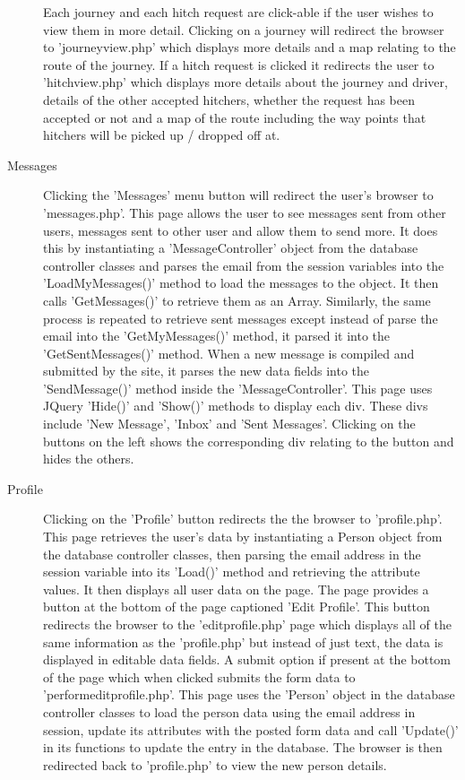 \begin{description}
		Each journey and each hitch request are click-able if the user wishes to view them in more detail. Clicking on a journey will redirect the browser to 'journey\textunderscore view.php' which displays more details and a map relating to the route of the journey. If a hitch request is clicked it redirects the user to 'hitch\textunderscore view.php' which displays more details about the journey and driver, details of the other accepted hitchers, whether the request has been accepted or not and a map of the route including the way points that hitchers will be picked up / dropped off at.
		\item[Messages] Clicking the 'Messages' menu button will redirect the user's browser to 'messages.php'. This page allows the user to see messages sent from other users, messages sent to other user and allow them to send more. It does this by instantiating a 'Message\textunderscore Controller' object from the database controller classes and parses the email from the session variables into the 'LoadMyMessages()' method to load the messages to the object. It then calls 'GetMessages()' to retrieve them as an Array. Similarly, the same process is repeated to retrieve sent messages except instead of parse the email into the 'GetMyMessages()' method, it parsed it into the 'GetSentMessages()' method. When a new message is compiled and submitted by the site, it parses the new data fields into the 'SendMessage()' method inside the 'Message\textunderscore Controller'. This page uses JQuery 'Hide()' and 'Show()' methods to display each div. These divs include 'New Message', 'Inbox' and 'Sent Messages'. Clicking on the buttons on the left shows the corresponding div relating to the button and hides the others.
		\item[Profile] Clicking on the 'Profile' button redirects the the browser to 'profile.php'. This page retrieves the user's data by instantiating a Person object from the database controller classes, then parsing the email address in the session variable into its 'Load()' method and retrieving the attribute values. It then displays all user data on the page. The page provides a button at the bottom of the page captioned 'Edit Profile'. This button redirects the browser to the 'edit\textunderscore profile.php' page which displays all of the same information as the 'profile.php' but instead of just text, the data is displayed in editable data fields. A submit option if present at the bottom of the page which when clicked submits the form data to 'perform\textunderscore edit\textunderscore profile.php'. This page uses the 'Person' object in the database controller classes to load the person data using the email address in session, update its attributes with the posted form data and call 'Update()' in its functions to update the entry in the database. The browser is then redirected back to 'profile.php' to view the new person details.

\end{description}
